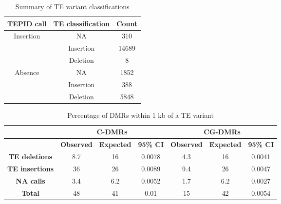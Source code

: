\documentclass[12pt]{article}
\begin{document}
\vspace*{1 cm}

\begin{table}[h]
  \centering
  \caption{Summary of TE variant classifications}
  \label{table2}
  \begin{tabular}{@{}ccc@{}}
    \toprule
    \textbf{TEPID call}        & \textbf{TE classification} & \textbf{Count} \\ \midrule
    \multirow{3}{*}{Insertion} & NA                         & 310            \\
    & Insertion                  & 14689          \\
    & Deletion                  & 8              \\ \midrule
    \multirow{3}{*}{Absence}   & NA                         & 1852           \\
    & Insertion                  & 388            \\
    & Deletion                   & 5848  \\ \bottomrule
  \end{tabular}
\end{table}

\vspace*{1 cm}

\begin{table}[h]
  \centering
  \caption{Percentage of DMRs within 1 kb of a TE variant}
  \label{table3}
  \begin{tabular}{@{}cccc|ccc@{}}
    \toprule
    \textbf{}              & \multicolumn{3}{c|}{\textbf{C-DMRs}}                     & \multicolumn{3}{c}{\textbf{CG-DMRs}}                    \\ \midrule
    \textbf{}              & \textbf{Observed} & \textbf{Expected} & \textbf{95\% CI} & \textbf{Observed} & \textbf{Expected} & \textbf{95\% CI} \\ \midrule
    \textbf{TE deletions}  & 8.7               & 16                & 0.0078           & 4.3               & 16                & 0.0041           \\
    \textbf{TE insertions} & 36                & 26                & 0.0089           & 9.4               & 26                & 0.0047           \\
    \textbf{NA calls}      & 3.4               & 6.2               & 0.0052           & 1.7               & 6.2               & 0.0027           \\
    \textbf{Total}         & 48                & 41                & 0.01             & 15                & 42                & 0.0054           \\ \bottomrule
  \end{tabular}
\end{table}
\end{document}
